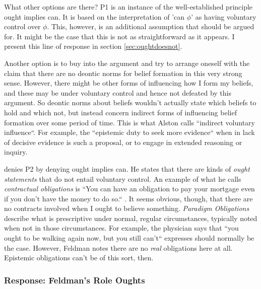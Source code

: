 \documentclass[12pt,numbers=noenddot]{scrartcl}
\begin{document}
What other options are there? P1 is an instance of the well-established principle ought implies can. It is based on the interpretation of 'can $\phi$' as having voluntary control over $\phi$. This, however, is an additional assumption that should be argued for. It might be the case that this is not as straightforward as it appears. I present this line of response in section \ref{sec:oughtdoesnot}.

Another option is to buy into the argument and try to arrange oneself with the claim that there are no deontic norms for belief formation in this very strong sense. However, there might be other forms of influencing how I form my beliefs, and these may be under voluntary control and hence not defeated by this argument. So deontic norms about beliefs wouldn't actually state which beliefs to hold and which not, but instead concern indirect forms of influencing belief formation over some period of time. This is what Alston calls “indirect voluntary influence“. For example, the “epistemic duty to seek more evidence“ \textcite{Hall1998-HALTED-2} when in lack of decisive evidence is such a proposal, or to engage in extended reasoning or inquiry.

\textcite{Feldman2001-FELVBA} denies P2 by denying ought implies can. He states that there are kinds of \emph{ought statements} that do not entail voluntary control. An example of what he calls \emph{contractual obligations} is “You can have an obligation to pay your mortgage even if you don't have the money to do so.“ \autocite[674]{Feldman2000-FELTEO-2}. It seems obvious, though, that there are no contracts involved when I ought to believe something. \emph{Paradigm Obligations} describe what is prescriptive under normal, regular circumstances, typically noted when not in those circumstances. For example, the physician says that “you ought to be walking again now, but you still can't“ \autocite[675]{Feldman2000-FELTEO-2} expresses should normally be the case. However, Feldman notes there are no \emph{real} obligations here at all. Epistemic obligations can't be of this sort, then. 

\subsubsection{Response: Feldman's Role Oughts}
\end{document}
